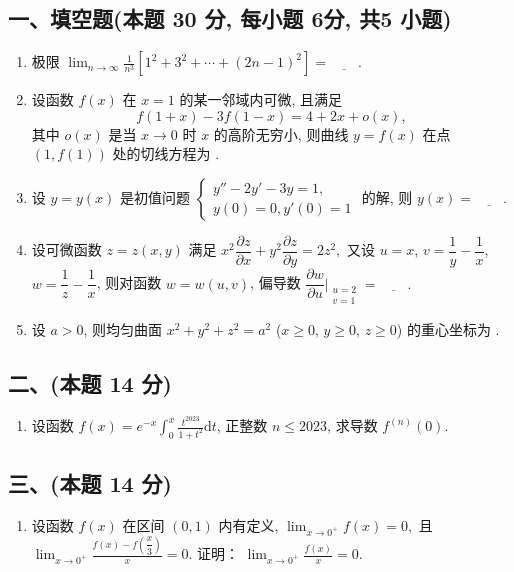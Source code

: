 \subsection*{一、填空题(本题 30 分,  每小题 6分,  共5 小题)}
\begin{enumerate}
    \item 极限 $ \displaystyle\lim_{n \to \infty} \frac{1}{n^3} \left[ 1^2 + 3^2 + \cdots + (2n - 1)^2 \right] = \underline{\quad\quad}. $
    \item 设函数 $f(x)$ 在 $x = 1$ 的某一邻域内可微, 且满足
          \[ f(1 + x) - 3f(1 - x) = 4 + 2x + o(x),  \]
          其中 $o(x)$ 是当 $x \to 0$ 时 $x$ 的高阶无穷小, 则曲线 $y = f(x)$ 在点 $(1,  f(1))$ 处的切线方程为 \underline{\quad\quad}.
    \item 设 $y = y(x)$ 是初值问题
          $ \begin{cases}
                  y'' - 2y' - 3y = 1, \\
                  y(0) = 0,  y'(0) = 1
              \end{cases} $
          的解, 则 $y(x) = \underline{\quad\quad}.$
    \item 设可微函数 $z = z(x,  y)$ 满足
          $ x^2 \dfrac{\partial z}{\partial x} + y^2 \dfrac{\partial z}{\partial y} = 2z^2,  $
          又设 $u = x$,  $v = \dfrac{1}{y} - \dfrac{1}{x}$,  $w = \dfrac{1}{z} - \dfrac{1}{x}$, 则对函数 $w = w(u,  v)$, 偏导数
          $ \dfrac{\partial w}{\partial u} \bigg|_{\substack{u=2 \\ v=1}} = \underline{\quad\quad}. $
    \item 设 $a > 0$, 则均匀曲面 $x^2 + y^2 + z^2 = a^2$ ($x \geq 0$,  $y \geq 0$,  $z \geq 0$) 的重心坐标为 \underline{\quad\quad}.
\end{enumerate}

\subsection*{二、(本题 14 分)}
\begin{enumerate}[start=6]
    \item 设函数 $f(x) = e^{-x} \displaystyle\int_{0}^{x} \frac{t^{2023}}{1+t^2} \mathrm{d}t$, 正整数 $n \leq 2023$, 求导数 $f^{(n)}(0)$.
\end{enumerate}

\subsection*{三、(本题 14 分)}
\begin{enumerate}[start=7]
    \item 设函数 $f(x)$ 在区间 $(0, 1)$ 内有定义,
          $ \displaystyle\lim_{x \to 0^+} f(x) = 0,  $
          且
          $ \displaystyle\lim_{x \to 0^+} \frac{f(x) - f\left(\dfrac{x}{3}\right)}{x} = 0. $
          证明：
          $ \displaystyle\lim_{x \to 0^+} \frac{f(x)}{x} = 0. $
\end{enumerate}

